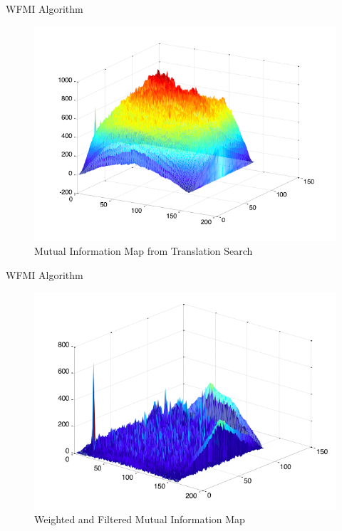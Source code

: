 \documentclass{beamer}
\begin{document}
\begin{frame}[c]{\sc WFMI Algorithm}

\begin{figure}[!h]
\centering
\includegraphics[height=.7\textheight]{MutualInformationMap}
\caption{Mutual Information Map from Translation Search}
\label{MutualInformationMap}
\end{figure}

\end{frame}


\begin{frame}[c]{\sc WFMI Algorithm}

\begin{figure}[!h]
\centering
\includegraphics[height=.7\textheight]{FilteredMutualInformationMap}
\caption{Weighted and Filtered Mutual Information Map}
\label{FilteredMap}
\end{figure}

\end{frame}
\end{document}
